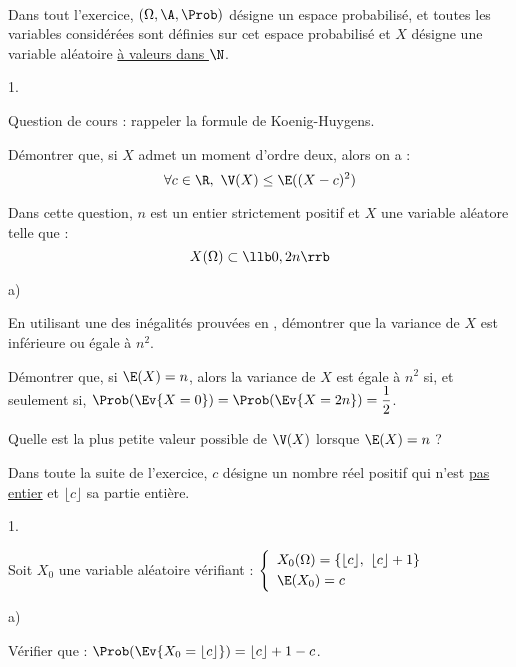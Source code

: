 
\begin{exerciceAP}~\\
  Dans tout l'exercice, $(\Omega, \A, \Prob)$ désigne un espace 
  probabilisé, et toutes les variables considérées sont définies sur 
  cet espace probabilisé et $X$ désigne une variable aléatoire 
  \underline{à valeurs dans $\N$}.
  \begin{noliste}{1.}
    \setlength{\itemsep}{2mm}
    \item Question de cours : rappeler la formule de Koenig-Huygens.
    
    \item Démontrer que, si $X$ admet un moment d'ordre deux, alors 
    on a :
    \[
      \forall c \in \R, \ \V(X) \leq \E((X-c)^2)
    \]
  \end{noliste}
  
  \item Dans cette question, $n$ est un entier strictement positif et 
  $X$ une variable aléatore telle que :
  \[
    X(\Omega) \subset \llb 0, 2n \rrb
  \]
  \begin{noliste}{a)}
    \setlength{\itemsep}{2mm}
    \item En utilisant une des inégalités prouvées en , 
    démontrer que la variance de $X$ est inférieure ou égale à $n^2$.
    
    \item Démontrer que, si $\E(X) = n$, alors la variance de $X$ est 
    égale à $n^2$ si, et seulement si, $\Prob(\Ev{X=0}) = 
    \Prob(\Ev{X=2n}) = \dfrac{1}{2}$.
    
    \item Quelle est la plus petite valeur possible de $\V(X)$ 
    lorsque $\E(X)=n$ ?
  \end{noliste}
  
  \noindent
  Dans toute la suite de l'exercice, $c$ désigne un nombre réel positif
  qui n'est \underline{pas entier} et $\lfloor c \rfloor$ sa partie 
  entière.
  \begin{noliste}{1.}
    \setlength{\itemsep}{2mm}
    \setcounter{enumi}{2}
    \item Soit $X_0$ une variable aléatoire vérifiant : $\left\{
    \begin{array}{l}
      X_0(\Omega) = \{ \lfloor c \rfloor, \ \lfloor c \rfloor 
      +1\}\\[.1cm]
      \E(X_0) = c
    \end{array}
    \right.$
    \begin{noliste}{a)}
    \setlength{\itemsep}{2mm}
      \item Vérifier que : $\Prob(\Ev{X_0 = \lfloor c \rfloor }) =
      \lfloor c \rfloor +1-c$.
      

\end{noliste}
\end{noliste}
\end{exerciceAP}
